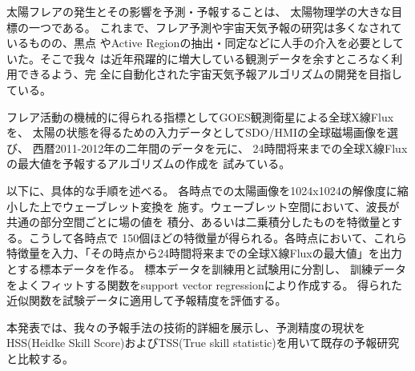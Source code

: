 \documentclass{2014a}
\begin{document}

太陽フレアの発生とその影響を予測・予報することは、
太陽物理学の大きな目標の一つである。
これまで、フレア予測や宇宙天気予報の研究は多くなされているものの、黒点
やActive Regionの抽出・同定などに人手の介入を必要としていた。そこで我々
は近年飛躍的に増大している観測データを余すところなく利用できるよう、完
全に自動化された宇宙天気予報アルゴリズムの開発を目指している。

フレア活動の機械的に得られる指標としてGOES観測衛星による全球X線Fluxを、
太陽の状態を得るための入力データとしてSDO/HMIの全球磁場画像を選び、
西暦2011-2012年の二年間のデータを元に、
24時間将来までの全球X線Fluxの最大値を予報するアルゴリズムの作成を
試みている。

以下に、具体的な手順を述べる。
各時点での太陽画像を1024x1024の解像度に縮小した上でウェーブレット変換を
施す。ウェーブレット空間において、波長が共通の部分空間ごとに場の値を
積分、あるいは二乗積分したものを特徴量とする。こうして各時点で
150個ほどの特徴量が得られる。各時点において、これら特徴量を入力、「その時点から24時間将来までの全球X線Fluxの最大値」を出力とする標本データを作る。
標本データを訓練用と試験用に分割し、
訓練データをよくフィットする関数をsupport vector regressionにより作成する。
得られた近似関数を試験データに適用して予報精度を評価する。

本発表では、我々の予報手法の技術的詳細を展示し、予測精度の現状をHSS(Heidke Skill Score)およびTSS(True skill statistic)を用いて既存の予報研究と比較する。


\end{document}
